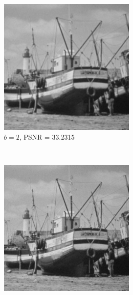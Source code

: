 \documentclass{article}
\begin{document}
\begin{enumerate}[label=(\alph*)]
\begin{figure}[!htb]
        \begin{subfigure}[b]{0.3\textwidth}
            \includegraphics[width=\textwidth]{img/RG2.png}
            \caption{$b = 2$, PSNR = 33.2315}
        \end{subfigure}
        ~
        \begin{subfigure}[b]{0.3\textwidth}
            \includegraphics[width=\textwidth]{img/RG5.png}

\end{subfigure}
\end{figure}
\end{enumerate}
\end{document}
